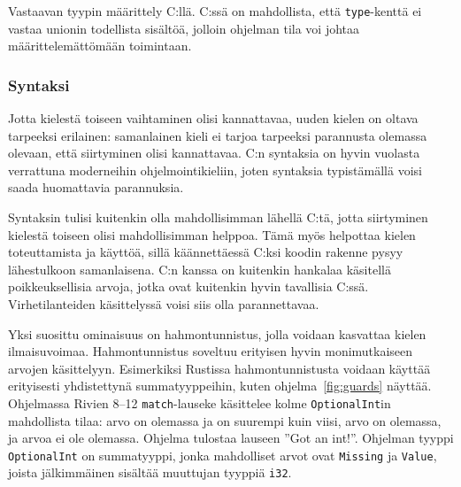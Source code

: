 \FloatBarrier

\begin{listing}[ht!]
    \inputminted{C}{sumtype.c}
    \caption{Vastaavan tyypin määrittely C:llä. C:ssä on mahdollista, että
    \texttt{type}-kenttä ei vastaa unionin todellista sisältöä, jolloin
    ohjelman tila voi johtaa määrittelemättömään toimintaan.}
    \label{fig:sumtypec}
\end{listing}

\FloatBarrier


\subsubsection{Syntaksi}

Jotta kielestä toiseen vaihtaminen olisi kannattavaa, uuden kielen on oltava
tarpeeksi erilainen: samanlainen kieli ei tarjoa tarpeeksi parannusta
olemassa olevaan, että siirtyminen olisi kannattavaa. C:n syntaksia on hyvin
vuolasta verrattuna moderneihin ohjelmointikieliin, joten syntaksia
typistämällä voisi saada huomattavia parannuksia.

%

Syntaksin tulisi kuitenkin olla mahdollisimman lähellä C:tä, jotta siirtyminen
kielestä toiseen olisi mahdollisimman helppoa. Tämä myös helpottaa kielen
toteuttamista ja käyttöä, sillä käännettäessä C:ksi koodin rakenne pysyy
lähestulkoon samanlaisena. C:n kanssa on kuitenkin hankalaa käsitellä
poikkeuksellisia arvoja, jotka ovat kuitenkin hyvin tavallisia C:ssä.
Virhetilanteiden käsittelyssä voisi siis olla parannettavaa.

\newpage

Yksi suosittu ominaisuus on hahmontunnistus, jolla
voidaan kasvattaa kielen ilmaisuvoimaa. Hahmontunnistus soveltuu erityisen
hyvin monimutkaiseen arvojen käsittelyyn. Esimerkiksi Rustissa
hahmontunnistusta voidaan käyttää erityisesti yhdistettynä summatyyppeihin,
kuten ohjelma~\ref{fig:guards} näyttää. Ohjelmassa Rivien 8--12
\texttt{match}-lauseke käsittelee kolme \texttt{OptionalInt}in mahdollista
tilaa: arvo on olemassa ja on suurempi kuin viisi, arvo on olemassa, ja arvoa
ei ole olemassa. Ohjelma tulostaa lauseen ''Got an int!''. Ohjelman tyyppi
\texttt{OptionalInt} on summatyyppi, jonka mahdolliset arvot ovat
\texttt{Missing} ja \texttt{Value}, joista jälkimmäinen sisältää muuttujan
tyyppiä \texttt{i32}.


